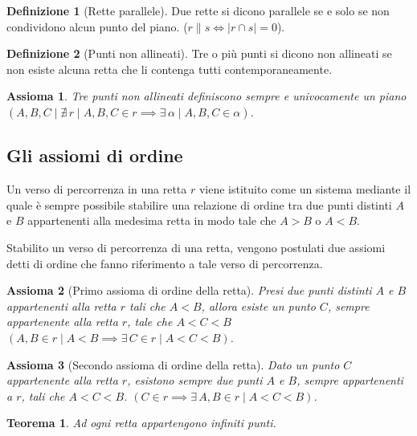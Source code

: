 \documentclass{article}
\newtheorem{axiom}{Assioma}[section]
\newtheorem{theorem}{Teorema}[section]
\theoremstyle{definition}
\newtheorem{definition}{Definizione}[section]
\begin{document}
\begin{definition}[Rette parallele]
    Due rette si dicono parallele se e solo se
    non condividono alcun punto del piano.
    ($r \parallel s \iff |r \cap s| = 0$).
\end{definition}

\begin{definition}[Punti non allineati]
    Tre o più punti si dicono non allineati se
    non esiste alcuna retta che li contenga tutti
    contemporaneamente.
\end{definition}

\begin{axiom}
    \label{piano:tre_punti}
    Tre punti non allineati definiscono sempre e
    univocamente un piano
    $(A, B, C \mid \nexists \, r \mid A, B, C \in r \implies
        \exists \, \alpha \mid A, B, C \in \alpha)$.
\end{axiom}

\subsection{Gli assiomi di ordine}

Un verso di percorrenza in una retta $r$ viene istituito come
un sistema mediante il quale è sempre possibile stabilire una
relazione di ordine tra due punti distinti $A$ e $B$ appartenenti
alla medesima retta in modo tale che $A>B$ o $A<B$.

Stabilito un verso di percorrenza di una retta, vengono
postulati due assiomi detti di ordine che fanno riferimento
a tale verso di percorrenza.

\begin{axiom}[Primo assioma di ordine della retta]
    Presi due punti distinti $A$ e $B$ appartenenti alla retta $r$
    tali che $A<B$, allora esiste un punto $C$, sempre
    appartenente alla retta $r$, tale che $A<C<B$
    $(A,B \in r \mid A<B \implies \exists \, C \in r \mid A<C<B)$.
\end{axiom}

\begin{axiom}[Secondo assioma di ordine della retta]
    \label{retta:secondo_assioma_ordine}
    Dato un punto $C$ appartenente alla retta $r$, esistono
    sempre due punti $A$ e $B$, sempre appartenenti a $r$,
    tali che $A<C<B$.
    $(C \in r \implies \exists \, A,B \in r \mid A<C<B)$.
\end{axiom}

\begin{theorem}
    \label{retta:infiniti_punti}
    Ad ogni retta appartengono infiniti punti.
\end{theorem}
\end{document}

